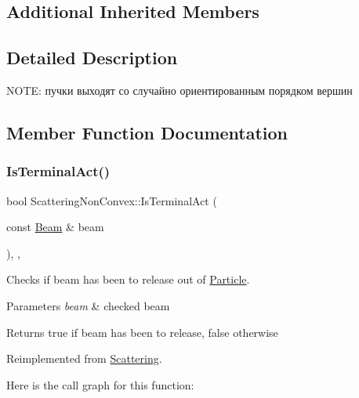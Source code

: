 \subsection*{Additional Inherited Members}


\subsection{Detailed Description}
N\+O\+TE\+: пучки выходят со случайно ориентированным порядком вершин 

\subsection{Member Function Documentation}
\mbox{\label{class_scattering_non_convex_aeda4103d997bc16e155fcc8281a51b05}} 
\subsubsection{\texorpdfstring{Is\+Terminal\+Act()}{IsTerminalAct()}}
{\footnotesize\ttfamily bool Scattering\+Non\+Convex\+::\+Is\+Terminal\+Act (\begin{DoxyParamCaption}\item[{const \mbox{\hyperlink{class_beam}{Beam}} \&}]{beam }\end{DoxyParamCaption})\hspace{0.3cm}{\ttfamily [override]}, {\ttfamily [protected]}, {\ttfamily [virtual]}}



Checks if beam has been to release out of \mbox{\hyperlink{class_particle}{Particle}}. 


\begin{DoxyParams}{Parameters}
{\em beam} & checked beam \\
\hline
\end{DoxyParams}
\begin{DoxyReturn}{Returns}
true if beam has been to release, false otherwise 
\end{DoxyReturn}


Reimplemented from \mbox{\hyperlink{class_scattering_abe93cd1898e52b1601c96735020454fe}{Scattering}}.

Here is the call graph for this function\+:
\mbox{\label{class_scattering_non_convex_a574f2c4d503c6751f374e37e632f584a}} 
